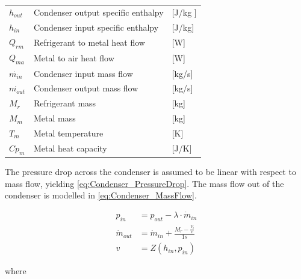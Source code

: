 \begin{center}
	\begin{tabular}{l p{8cm} l}
		$h_{out}$       & Condenser output specific enthalpy & [\si{J}/\si{kg} ] \\
		$h_{in}$        & Condenser input specific enthalpy  & [\si{J}/\si{kg}]  \\
		$Q_{rm}$        & Refrigerant to metal heat flow     & [\si{W}]          \\
		$Q_{ma}$        & Metal to air heat flow             & [\si{W}]          \\
		$\dot{m_{in}}$  & Condenser input mass flow          & [\si{kg}/\si{s}]  \\
		$\dot{m_{out}}$ & Condenser output mass flow         & [\si{kg}/\si{s}]  \\
		$M_r$           & Refrigerant mass                   & [\si{kg}]         \\
		$M_m$           & Metal mass                         & [\si{kg}]         \\
		$T_m$           & Metal temperature                  & [\si{K}]          \\
		$Cp_m$          & Metal heat capacity                & [\si{J}/\si{K}]
	\end{tabular}
\end{center}

The pressure drop across the condenser is assumed to be linear with respect to mass flow, yielding \cref{eq:Condenser_PressureDrop}.
The mass flow out of the condenser is modelled in \cref{eq:Condenser_MassFlow}.


\begin{align}
	p_{in} 	& =  p_{out} - \lambda \cdot \dot{m}_{in}  				\label{eq:Condenser_PressureDrop}\\
	\dot{m}_{out}		& = \dot{m}_{in} + \frac{M_r - \frac{V_i}{v}}{1s}		\label{eq:Condenser_MassFlow} \\
	v & = Z(h_{in}, p_{in})
\end{align}

where

